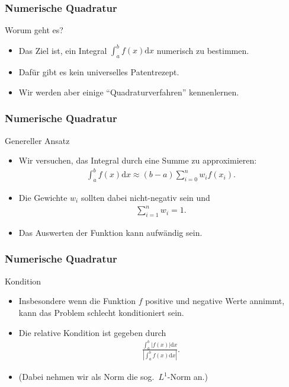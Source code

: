\documentclass{beamer}
\title[Annuma]{\mytitle}
\author[Amin Coja-Oghlan]{Amin Coja-Oghlan}
\institute[Frankfurt]{JWGUFFM}
\date{}
\newcommand\dd{\mathrm d}
\newcommand{\abs}[1]{\left|#1\right|}
\renewcommand{\ae}{\"a}
\newcommand{\ue}{\"u}
\newcommand{\mytitle}{Numerische Quadratur}
\begin{document}
\frame[plain]{\titlepage}

\begin{frame}\frametitle{\mytitle}
	\begin{block}{Worum geht es?}
		\begin{itemize}
			\item Das Ziel ist, ein Integral $\int_a^bf(x)\dd x$ numerisch zu bestimmen.
			\item Daf\ue r gibt es kein universelles Patentrezept.
			\item Wir werden aber einige ``Quadraturverfahren'' kennenlernen.
		\end{itemize}
	\end{block}
\end{frame}

\begin{frame}\frametitle{\mytitle}
	\begin{block}{Genereller Ansatz}
		\begin{itemize}
			\item Wir versuchen, das Integral durch eine Summe zu approximieren:
				\begin{align*}
					\int_a^bf(x)\dd x\approx(b-a)\sum_{i=0}^nw_if(x_i).
				\end{align*}
			\item Die Gewichte $w_i$ sollten dabei nicht-negativ sein und
				\begin{align*}
					\sum_{i=1}^nw_i=1.
				\end{align*}
			\item Das Auswerten der Funktion kann aufw\ae ndig sein.
		\end{itemize}
	\end{block}
\end{frame}

\begin{frame}\frametitle{\mytitle}
	\begin{block}{Kondition}
		\begin{itemize}
			\item Insbesondere wenn die Funktion $f$ positive und negative Werte annimmt, kann das Problem schlecht konditioniert sein.
			\item Die relative Kondition ist gegeben durch
				\begin{align*}
					\frac{\int_a^b|f(x)|\dd x}{\abs{\int_a^bf(x)\dd x}}.
				\end{align*}
			\item (Dabei nehmen wir als Norm die sog.\ $L^1$-Norm an.)
		\end{itemize}
	\end{block}
\end{frame}
\end{document}
